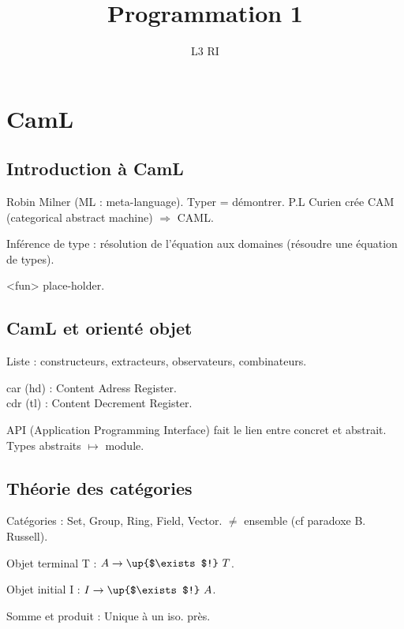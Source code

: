 \documentclass[french]{article}
\title{Programmation 1}
\date{}
\author{L3 RI}
\begin{document}
\maketitle
\tableofcontents
\newpage

\section{CamL}

\subsection{Introduction à CamL}
Robin Milner (ML : meta-language).
Typer = démontrer.
P.L Curien crée CAM (categorical abstract machine)
$\Rightarrow$ CAML.

Inférence de type : résolution de l'équation aux domaines (résoudre une équation de types).

<fun> place-holder.

\subsection{CamL et orienté objet}
Liste : constructeurs, extracteurs, observateurs, combinateurs.

car (hd) : Content Adress Register.\\
cdr (tl) : Content Decrement Register.

API (Application Programming Interface) fait le lien entre concret et abstrait. Types abstraits $\mapsto$ module.

\subsection{Théorie des catégories}
Catégories : Set, Group, Ring, Field, Vector. $\neq$ ensemble (cf paradoxe B. Russell).

Objet terminal T : $A \rightarrow\up{$\exists$!}\ T$.

Objet initial I : $I \rightarrow\up{$\exists$!}\ A$.

Somme et produit : Unique à un iso. près.
\end{document}
